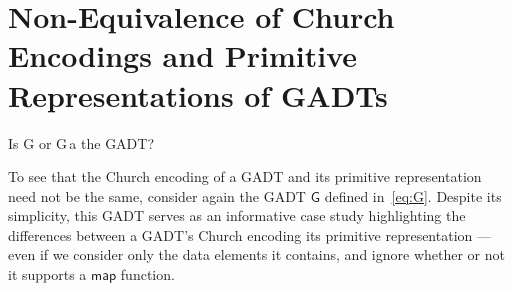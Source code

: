 \documentclass[acmsmall,screen,review,anonymous]{acmart}
\theoremstyle{definition}
\begin{document}
\section{Non-Equivalence of Church Encodings and Primitive
  Representations of GADTs}\label{sec:non-equiv}

{\color{blue} Is G or G\,a the GADT?}

To see that the Church encoding of a GADT and its primitive
representation need not be the same, consider again the GADT
$\mathsf{G}$ defined in~\eqref{eq:G}. Despite its simplicity, this
GADT serves as an informative case study highlighting the differences
between a GADT's Church encoding its primitive representation --- even
if we consider only the data elements it contains, and ignore whether
or not it supports a $\mathsf{map}$ function.
\end{document}
